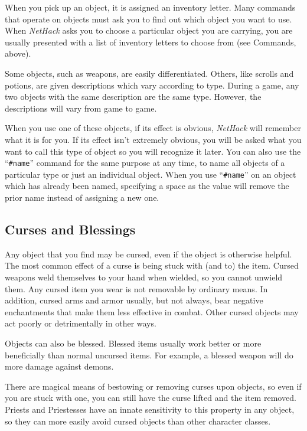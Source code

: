When you pick up an object, it is assigned an inventory letter.  Many
commands that operate on objects must ask you to find out which object
you want to use.  When {\it NetHack\/} asks you to choose a particular object
you are carrying, you are usually presented with a list of inventory
letters to choose from (see Commands, above).

Some objects, such as weapons, are easily differentiated.  Others, like
scrolls and potions, are given descriptions which vary according to
type.  During a game, any two objects with the same description are
the same type.  However, the descriptions will vary from game to game.

When you use one of these objects, if its effect is obvious, {\it NetHack\/}
will remember what it is for you.  If its effect isn't extremely
obvious, you will be asked what you want to call this type of object
so you will recognize it later.  You can also use the ``{\tt \#name}''
command for the same purpose at any time, to name all objects of a
particular type or just an individual object.
When you use ``{\tt \#name}'' on an object which has already been named,
specifying a space as the value will remove the prior name instead
of assigning a new one.

\subsection*{Curses and Blessings}

Any object that you find may be cursed, even if the object is
otherwise helpful.  The most common effect of a curse is being stuck
with (and to) the item.  Cursed weapons weld themselves to your hand
when wielded, so you cannot unwield them.  Any cursed item you wear
is not removable by ordinary means.  In addition, cursed arms and armor
usually, but not always, bear negative enchantments that make them
less effective in combat.  Other cursed objects may act poorly or
detrimentally in other ways.

Objects can also be blessed.  Blessed items usually work better or
more beneficially than normal uncursed items.  For example, a blessed
weapon will do more damage against demons.

There are magical means of bestowing or removing curses upon objects,
so even if you are stuck with one, you can still have the curse
lifted and the item removed.  Priests and Priestesses have an innate
sensitivity to this property in any object, so they can more easily avoid
cursed objects than other character classes.

